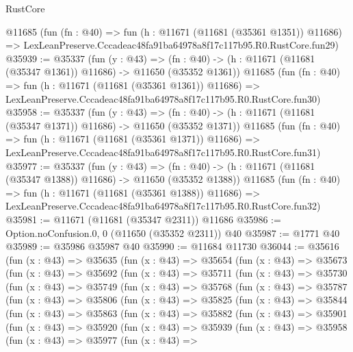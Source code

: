 \begin{lexlean}{RustCore}
\begin{coremodule}
    @11685
    (fun (fn : @40) =>
    fun (h : @11671 (@11681 (@35361 @1351)) @11686) =>
    LexLeanPreserve.Cccadeac48fa91ba64978a8f17c117b95.R0.RustCore.fun29)
@35939 := @35337
    (fun (y : @43) =>
    (fn : @40) -> (h : @11671 (@11681 (@35347 @1361)) @11686) -> @11650 (@35352 @1361))
    @11685
    (fun (fn : @40) =>
    fun (h : @11671 (@11681 (@35361 @1361)) @11686) =>
    LexLeanPreserve.Cccadeac48fa91ba64978a8f17c117b95.R0.RustCore.fun30)
@35958 := @35337
    (fun (y : @43) =>
    (fn : @40) -> (h : @11671 (@11681 (@35347 @1371)) @11686) -> @11650 (@35352 @1371))
    @11685
    (fun (fn : @40) =>
    fun (h : @11671 (@11681 (@35361 @1371)) @11686) =>
    LexLeanPreserve.Cccadeac48fa91ba64978a8f17c117b95.R0.RustCore.fun31)
@35977 := @35337
    (fun (y : @43) =>
    (fn : @40) -> (h : @11671 (@11681 (@35347 @1388)) @11686) -> @11650 (@35352 @1388))
    @11685
    (fun (fn : @40) =>
    fun (h : @11671 (@11681 (@35361 @1388)) @11686) =>
    LexLeanPreserve.Cccadeac48fa91ba64978a8f17c117b95.R0.RustCore.fun32)
@35981 := @11671 (@11681 (@35347 @2311)) @11686
@35986 := Option.noConfusion.{0, 0} (@11650 (@35352 @2311)) @40
@35987 := @1771 @40
@35989 := @35986 @35987 @40
@35990 := @11684 @11730
@36044 := @35616
    (fun (x : @43) =>
    @35635
      (fun (x : @43) =>
      @35654
        (fun (x : @43) =>
        @35673
          (fun (x : @43) =>
          @35692
            (fun (x : @43) =>
            @35711
              (fun (x : @43) =>
              @35730
                (fun (x : @43) =>
                @35749
                  (fun (x : @43) =>
                  @35768
                    (fun (x : @43) =>
                    @35787
                      (fun (x : @43) =>
                      @35806
                        (fun (x : @43) =>
                        @35825
                          (fun (x : @43) =>
                          @35844
                            (fun (x : @43) =>
                            @35863
                              (fun (x : @43) =>
                              @35882
                                (fun (x : @43) =>
                                @35901
                                  (fun (x : @43) =>
                                  @35920
                                    (fun (x : @43) =>
                                    @35939
                                      (fun (x : @43) =>
                                      @35958
                                        (fun (x : @43) =>
                                        @35977
                                          (fun (x : @43) =>

\end{coremodule}
\end{lexlean}
